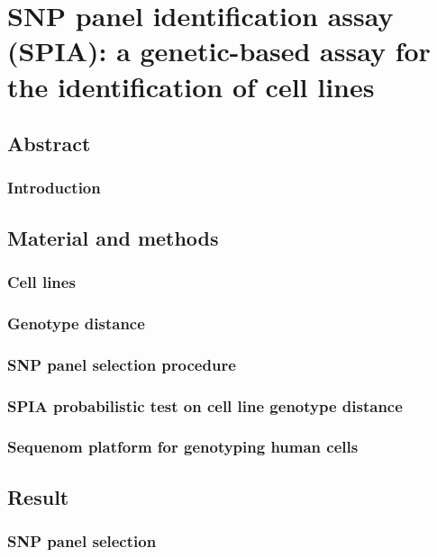 \chapter{SNP panel identification assay (SPIA): a genetic-based assay for the identification of cell lines}

\section{Abstract}

	\subsection{Introduction}

\section{Material and methods}

	\subsection{Cell lines}

	\subsection{Genotype distance}

	\subsection{SNP panel selection procedure}

	\subsection{SPIA probabilistic test on cell line genotype distance}

	\subsection{Sequenom platform for genotyping human cells}

\section{Result}

	\subsection{SNP panel selection}

